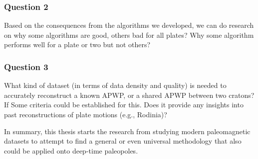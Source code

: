 \subsubsection{Question 2}

Based on the consequences from the algorithms we developed, we can do research
on why some algorithms are good, others bad for all plates? Why some algorithm
performs well for a plate or two but not others?

\subsubsection{Question 3}

What kind of dataset (in terms of data density and quality) is needed to
accurately reconstruct a known APWP, or a shared APWP between two cratons? If
Some criteria could be established for this. Does it provide any insights into
past reconstructions of plate motions (e.g., Rodinia)?

\bigskip
In summary, this thesis starts the research from studying modern paleomagnetic
datasets to attempt to find a general or even universal methodology that also
could be applied onto deep-time paleopoles.
